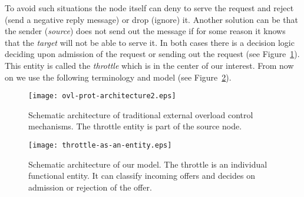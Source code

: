 \documentclass[conference]{IEEEtran}
\newcommand{\comment}[1]{}
\begin{document}
To avoid such situations the node itself can deny to serve the
request and reject (send a negative reply message) or drop (ignore)
it. Another solution can be that the sender (\textit{source}) does
not send out the message if for some reason it knows that the
\textit{target} will not be able to serve it. In both cases there is
a decision logic deciding upon admission of the request or sending
out the request (see Figure~\ref{fig:ovl-ctrl-architecture}). This
entity is called the \textit{throttle} which is in the center of our
interest. From now on we use the following terminology and model
(see Figure~\ref{fig:throttle-entity}).

\begin{figure}[h]
\begin{center}
\texttt{[image: ovl-prot-architecture2.eps]}
\end{center}
\caption{Schematic architecture of traditional external overload
control mechanisms. The throttle entity is part of the source
node.}\label{fig:ovl-ctrl-architecture}
\end{figure}

\comment{
\begin{figure}
\begin{center}
$\begin{array}{lr}
\texttt{[image: throttle-as-an-entity.eps]}
&
\texttt{[image: terminology-concept.eps]}
\end{array}$
\end{center}
\caption{The throttle as an individual
entity.}\label{fig:throttle-entity}
\end{figure}
}

\begin{figure}[h]
\begin{center}
\texttt{[image: throttle-as-an-entity.eps]}
\end{center}
\caption{Schematic architecture of our model. The throttle is an
individual functional entity. It can classify incoming offers and
decides on admission or rejection of the
offer.}\label{fig:throttle-entity}
\end{figure}
\end{document}
